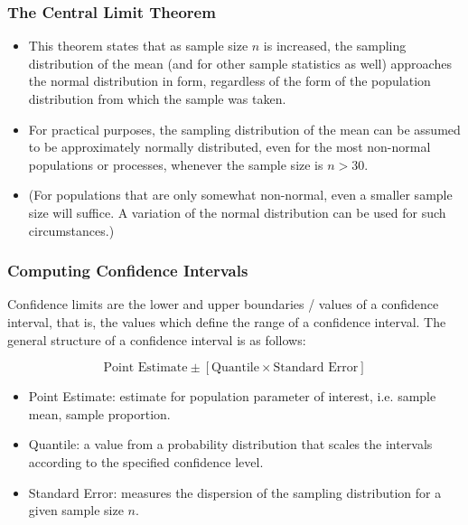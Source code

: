 \begin{frame}
\frametitle{The Central Limit Theorem}
\begin{itemize}
\item This theorem states that as sample size $n$ is increased, the sampling distribution of the mean (and for other sample statistics as well) approaches the normal distribution in form, regardless of the form of the population distribution from
which the sample was taken.

\item For practical purposes, the sampling distribution of the mean can be assumed to be
approximately normally distributed, even for the most non-normal populations or processes, whenever the
sample size is $n > 30$.

\item (For populations that are only somewhat non-normal, even a smaller sample size will
suffice. A variation of the normal distribution can be used for such circumstances.)
\end{itemize}


\end{frame}


\begin{frame}
\frametitle{Computing Confidence Intervals}
Confidence limits are the lower and upper boundaries / values of a confidence interval, that is, the values which define the range of a confidence interval. The general structure of a confidence interval is as follows:

\[ \mbox{Point Estimate}  \pm \left[ \mbox{Quantile} \times \mbox{Standard Error} \right] \]


\begin{itemize}
\item Point Estimate: estimate for population parameter of interest, i.e. sample mean, sample proportion.
\item Quantile: a value from a probability distribution that scales the intervals according to the specified confidence level.
\item Standard Error: measures the dispersion of the sampling distribution for a given sample size $n$.
\end{itemize}
\end{frame}



